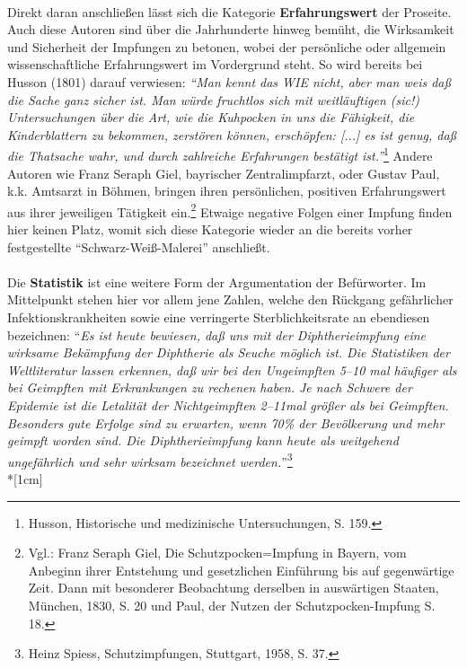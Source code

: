 \documentclass[
    a4paper,
    12pt,
    hyphens,
    chapterprefix=true,
    headheight=33pt,
    footheight=29pt,
    headings=optiontohead,
]{scrartcl}
\begin{document}
{\\
Direkt daran anschließen lässt sich die Kategorie \textbf{Erfahrungswert} der Proseite. Auch diese Autoren sind über die Jahrhunderte hinweg bemüht, die Wirksamkeit und Sicherheit der Impfungen zu betonen, wobei der persönliche oder allgemein wissenschaftliche Erfahrungswert im Vordergrund steht.
So wird bereits bei Husson (1801) darauf verwiesen: \textit{"`Man kennt das WIE nicht, aber man weis daß die Sache ganz sicher ist. Man würde fruchtlos sich mit weitläuftigen (sic!) Untersuchungen über die Art, wie die Kuhpocken in uns die Fähigkeit, die Kinderblattern zu bekommen, zerstören können, erschöpfen: [...] es ist genug, daß die Thatsache wahr, und durch zahlreiche Erfahrungen bestätigt ist."'}\footnote{Husson, Historische und medizinische Untersuchungen,  S. 159.} Andere Autoren wie Franz Seraph Giel, bayrischer Zentralimpfarzt, oder Gustav Paul, k.k. Amtsarzt in Böhmen, bringen ihren persönlichen, positiven Erfahrungswert aus ihrer jeweiligen Tätigkeit ein.\footnote{Vgl.: Franz Seraph Giel, Die Schutzpocken=Impfung in Bayern, vom Anbeginn ihrer Entstehung und gesetzlichen Einführung  bis auf gegenwärtige Zeit. Dann mit besonderer Beobachtung derselben in auswärtigen Staaten, München, 1830, S. 20 und Paul, der Nutzen der Schutzpocken-Impfung S. 18.} Etwaige negative Folgen einer Impfung finden hier keinen Platz, womit sich diese Kategorie wieder an die bereits vorher festgestellte "`Schwarz-Weiß-Malerei"' anschließt.\\
\\
Die \textbf{Statistik} ist eine weitere Form der Argumentation der Befürworter. Im Mittelpunkt stehen hier vor allem jene Zahlen, welche den Rückgang gefährlicher Infektionskrankheiten sowie eine verringerte Sterblichkeitsrate an ebendiesen bezeichnen: "`\textit{Es ist heute bewiesen, daß uns mit der Diphtherieimpfung eine wirksame Bekämpfung der Diphtherie als Seuche möglich ist. Die Statistiken der Weltliteratur lassen erkennen, daß wir bei den Ungeimpften 5--10 mal häufiger als bei Geimpften mit Erkrankungen zu rechenen haben. Je nach Schwere der Epidemie ist die Letalität der Nichtgeimpften 2--11mal größer als bei Geimpften. Besonders gute Erfolge sind zu erwarten, wenn 70\% der Bevölkerung und mehr geimpft worden sind. Die Diphtherieimpfung kann heute als weitgehend ungefährlich und sehr wirksam bezeichnet werden.}"'\footnote{Heinz Spiess, Schutzimpfungen, Stuttgart, 1958, S. 37.}
\\*[1cm]
}
\end{document}
